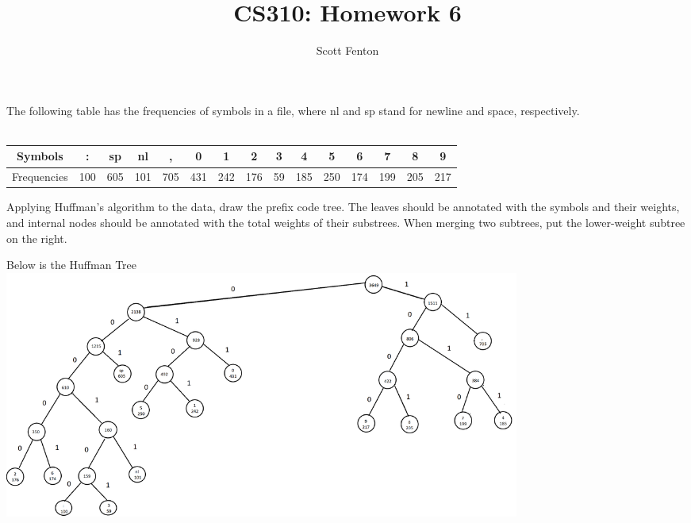 \documentclass[10pt]{article}
\newenvironment{exercise}[2][Exercise]{\begin{trivlist}
\item[\hskip \labelsep {\bfseries #1}\hskip \labelsep {\bfseries #2.}]}{\end{trivlist}}
\newenvironment{solution}[2][Solution]{\begin{trivlist}
\item[\hskip \labelsep {\bfseries #1}\hskip \labelsep {\bfseries #2.}]}{\end{trivlist}}
\theoremstyle{definition}
\begin{document}
 
 
 
\title{CS310: Homework 6}%
\author{Scott Fenton\\ %
} %
 
\maketitle
\begin{exercise}{(1)}
The following table has the frequencies of symbols in a file, where nl and sp stand for newline
and space, respectively. \\
\\
\begin{tabular}{c|c|c|c|c|c|c|c|c|c|c|c|c|c|c}
Symbols & : & sp & nl  & , & 0 & 1 & 2 & 3 & 4 & 5 & 6 & 7 & 8 & 9\\
\hline
Frequencies & 100 & 605 & 101 & 705 & 431 & 242 & 176 & 59 & 185 & 250 & 174 & 199 & 205 & 217\\

\end{tabular}
\end{exercise}
\begin{exercise}{(1A)} %
Applying Huffman’s algorithm to the data, draw the prefix code tree. The leaves should
be annotated with the symbols and their weights, and internal nodes should be annotated
with the total weights of their substrees. When merging two subtrees, put the lower-weight subtree on the right.
\end{exercise}
 
\begin{solution}{(1A)}
Below is the Huffman Tree\\
\includegraphics[width=170mm,scale=0.5]{huffman1.PNG}\\
\end{solution}
\end{document}
